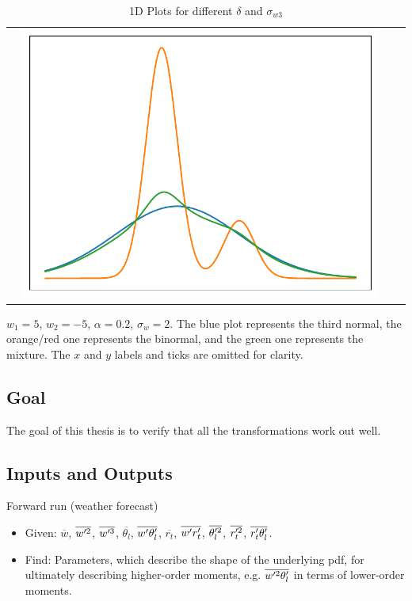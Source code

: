 \documentclass[10pt]{beamer}
\numberwithin{equation}{section}
\begin{document}
\begin{frame}
\begin{table}[!htb]
\begin{tabularx}{\textwidth}{c|@{}Y@{}@{}Y@{}@{}Y@{}}
                & \includegraphics[width = .29\textwidth]{include/figures/1dplotslw80_delta9}
            \end{tabularx}
            \caption{1D Plots for different $\delta$ and $\sigma_{w3}$}
            $w_1 = 5$, $w_2 = -5$, $\alpha = 0.2$, $\sigma_w = 2$.
            The blue plot represents the third normal,
            the orange/red one represents the binormal,
            and the green one represents the mixture.
            The $x$ and $y$ labels and ticks are omitted for clarity.
            \label{tab:1dplotbitri}
        \end{table}
    \end{frame}

    \subsection{Goal}\label{subsec:goal}

    \begin{frame}
        The goal of this thesis is to verify that all the transformations work out well.
    \end{frame}

    \subsection{Inputs and Outputs}\label{subsec:inputs-and-outputs}

    \begin{frame}{Forward run (weather forecast)}
        \begin{itemize}
            [<+->]
            \item Given: $\overline{w}$, $\overline{w'^2}$, $\overline{w'^3}$, $\overline{\theta_l}$, $\overline{w' \theta_l'}$,
            $\overline{r_t}$, $\overline{w' r_t'}$, $\overline{\theta_l'^2}$, $\overline{r_t'^2}$, $\overline{r_t' \theta_l'}$.
            \item Find: Parameters, which describe the shape of the underlying pdf,
            for ultimately describing higher-order moments,
            e.g. $\overline{w'^2 \theta_l'}$ in terms of lower-order moments.
        \end{itemize}
    \end{frame}
\end{document}
